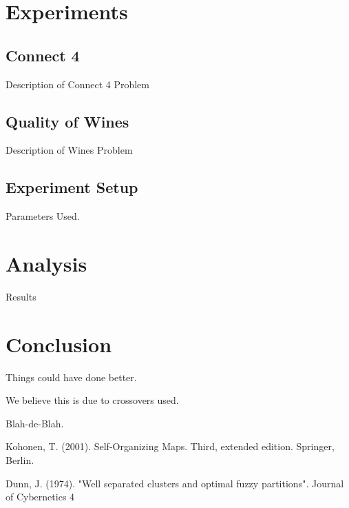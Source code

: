 \documentclass[journal]{IEEEtran}
\begin{document}
\section{Experiments}
  \subsection{Connect 4}
    Description of Connect 4 Problem
  \subsection{Quality of Wines}
    Description of Wines Problem
  \subsection{Experiment Setup}
    Parameters Used.
  
\section{Analysis}
Results

\section{Conclusion}
Things could have done better.

We believe this is due to crossovers used.

Blah-de-Blah.



%
%
%
\begin{thebibliography}{1}

Kohonen, T. (2001). Self-Organizing Maps. Third, extended edition. Springer, Berlin.

Dunn, J. (1974). "Well separated clusters and optimal fuzzy partitions". Journal of Cybernetics 4

\end{thebibliography}






\end{document}
